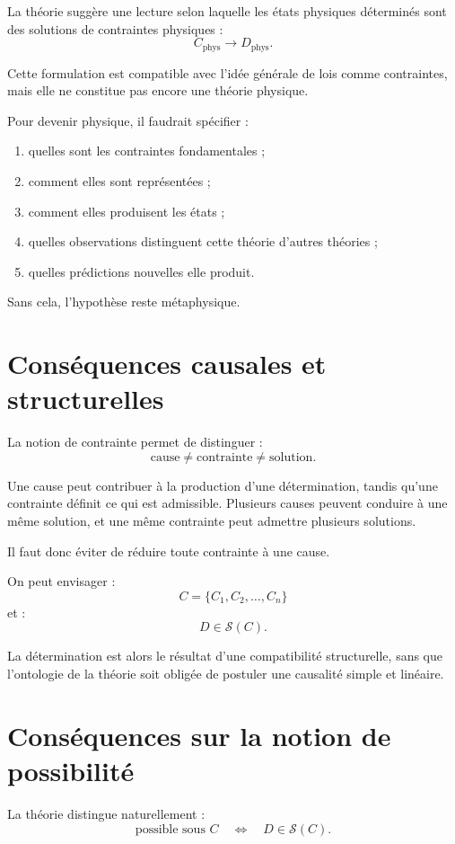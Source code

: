 \documentclass[11pt,a4paper]{article}
\begin{document}
La théorie suggère une lecture selon laquelle les états physiques déterminés
sont des solutions de contraintes physiques :
\[
C_{\mathrm{phys}}\longrightarrow D_{\mathrm{phys}}.
\]

Cette formulation est compatible avec l'idée générale de lois comme
contraintes, mais elle ne constitue pas encore une théorie physique.

Pour devenir physique, il faudrait spécifier :
\begin{enumerate}
\item quelles sont les contraintes fondamentales ;
\item comment elles sont représentées ;
\item comment elles produisent les états ;
\item quelles observations distinguent cette théorie d'autres théories ;
\item quelles prédictions nouvelles elle produit.
\end{enumerate}

Sans cela, l'hypothèse reste métaphysique.

\section{Conséquences causales et structurelles}

La notion de contrainte permet de distinguer :
\[
\text{cause}\neq\text{contrainte}\neq\text{solution}.
\]

Une cause peut contribuer à la production d'une détermination, tandis qu'une
contrainte définit ce qui est admissible. Plusieurs causes peuvent conduire
à une même solution, et une même contrainte peut admettre plusieurs solutions.

Il faut donc éviter de réduire toute contrainte à une cause.

On peut envisager :
\[
C=\{C_1,C_2,\ldots,C_n\}
\]
et :
\[
D\in\mathcal S(C).
\]

La détermination est alors le résultat d'une compatibilité structurelle,
sans que l'ontologie de la théorie soit obligée de postuler une causalité
simple et linéaire.

\section{Conséquences sur la notion de possibilité}

La théorie distingue naturellement :
\[
\text{possible sous \(C\)}
\quad\Longleftrightarrow\quad
D\in\mathcal S(C).
\]
\end{document}
